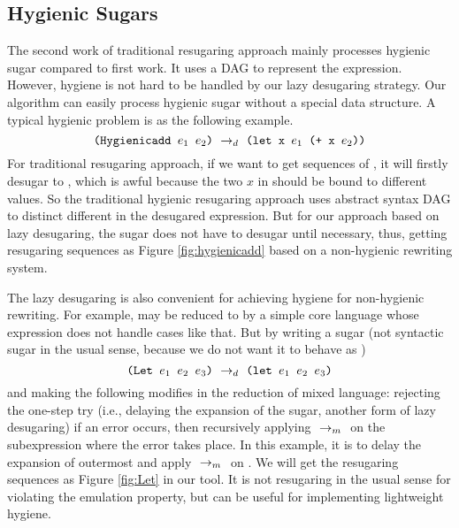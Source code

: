 \subsection{Hygienic Sugars}
\label{mark:hygienic}


The second work \cite{hygienic} of traditional resugaring approach mainly processes hygienic sugar compared to first work. It uses a DAG to represent the expression. However, hygiene is not hard to be handled by our lazy desugaring strategy. Our algorithm can easily process hygienic sugar without a special data structure.
A typical hygienic problem is as the following example.
\[
\texttt{(Hygienicadd $e_1$ $e_2$)} ~\rightarrow_d~ \texttt{(let x $e_1$ (+ x $e_2$))}
\]
For traditional resugaring approach, if we want to get sequences of , it will firstly desugar to , which is awful because the two $x$ in  should be bound to different values. So the traditional hygienic resugaring approach uses abstract syntax DAG to distinct different  in the desugared expression. But for our approach based on lazy desugaring, the  sugar does not have to desugar until necessary, thus, getting resugaring sequences as Figure \ref{fig:hygienicadd} based on a non-hygienic rewriting system.


The lazy desugaring is also convenient for achieving hygiene for non-hygienic rewriting. For example,  may be reduced to  by a simple core language whose  expression does not handle cases like that. But by writing a sugar (not syntactic sugar in the usual sense, because we do not want it to behave as ) 
\[\texttt{(Let~$e_1$~$e_2$~$e_3$)} ~\rightarrow_d~ \texttt{(let~$e_1$~$e_2$~$e_3$)}\]
and making the following modifies in the reduction of mixed language: rejecting the one-step try (i.e., delaying the expansion of the sugar, another form of lazy desugaring) if an error occurs, then recursively applying $~\rightarrow_m~$ on the subexpression where the error takes place. In this example, it is to delay the expansion of outermost  and apply $~\rightarrow_m~$ on . We will get the resugaring sequences as Figure \ref{fig:Let} in our tool. It is not resugaring in the usual sense for violating the emulation property, but can be useful for implementing lightweight hygiene.

